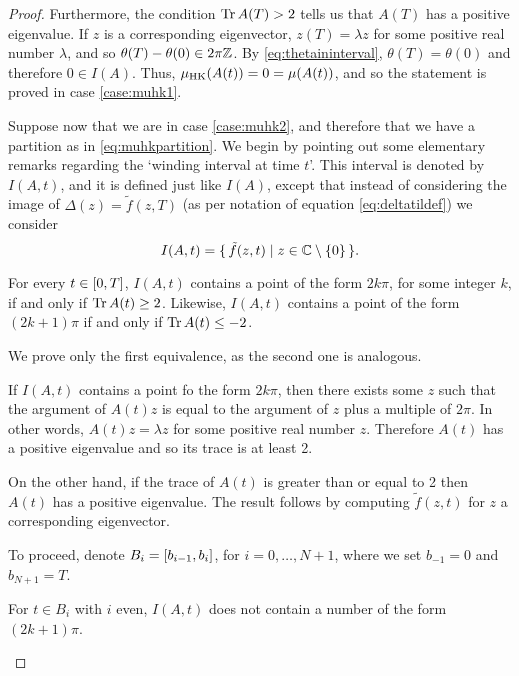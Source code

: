 \begin{proof}
Furthermore, the condition $\operatorname{Tr} A(T) > 2$ tells us that $A(T)$ has a positive eigenvalue. If $z$ is a corresponding eigenvector, $z(T) = \lambda z$ for some positive real number $\lambda$, and so $\theta(T) - \theta(0) \in 2 \pi \mathbb{Z}$. By \eqref{eq:thetaininterval}, $\theta(T) = \theta(0)$ and therefore $0 \in I(A)$. Thus, $\mu_{\mathrm{HK}}(A(t)) = 0 = \mu(A(t))$, and so the statement is proved in case \ref{case:muhk1}.

\smallskip

Suppose now that we are in case \ref{case:muhk2}, and therefore that we have a partition as in \ref{eq:muhkpartition}. We begin by pointing out some elementary remarks regarding the `winding interval at time $t$'. This interval is denoted by $I(A,t)$, and it is defined just like $I(A)$, except that instead of considering the image of $\Delta(z) = \tilde f(z,T)$ (as per notation of equation \eqref{eq:deltatildef}) we consider
\begin{equation}
I(A,t) = \{\, \tilde f(z,t) \mid z \in \mathbb{C} \setminus \{0\} \,\}.
\end{equation}

\begin{lemma}\label{lemma:hk1}
For every $t \in \interval0T$, $I(A,t)$ contains a point of the form $2k\pi$, for some integer $k$, if and only if $\operatorname{Tr} A(t) \geq 2$. Likewise, $I(A,t)$ contains a point of the form $(2k+1)\pi$ if and only if $\operatorname{Tr} A(t) \leq -2$.
\end{lemma}

\begin{lemmaproof}
We prove only the first equivalence, as the second one is analogous.

If $I(A,t)$ contains a point fo the form $2k\pi$, then there exists some $z$ such that the argument of $A(t) z$ is equal to the argument of $z$ plus a multiple of $2\pi$. In other words, $A(t) z = \lambda z$ for some positive real number $z$. Therefore $A(t)$ has a positive eigenvalue and so its trace is at least 2.

On the other hand, if the trace of $A(t)$ is greater than or equal to 2 then $A(t)$ has a positive eigenvalue. The result follows by computing $\tilde f(z,t)$ for $z$ a corresponding eigenvector.
\end{lemmaproof}

To proceed, denote $B_i = \interval{b_{i-1}}{b_i}$, for $i = 0, \dots, N+1$, where we set $b_{-1} = 0$ and $b_{N+1} = T$.

\begin{lemma}\label{lemma:hk2}
For $t \in B_i$ with $i$ even, $I(A,t)$ does not contain a number of the form $(2k+1)\pi$.


\end{lemma}
\end{proof}
